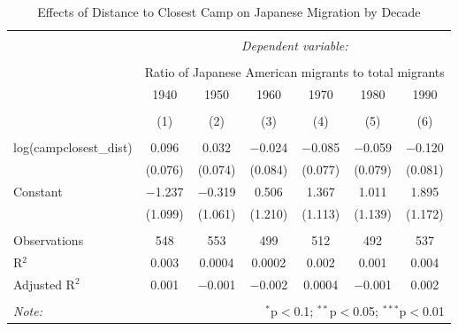 
\begin{table}[!htbp] \centering 
  \caption{Effects of Distance to Closest Camp on Japanese Migration by Decade} 
  \label{} 
\begin{tabular}{@{\extracolsep{5pt}}lcccccc} 
\\[-1.8ex]\hline 
\hline \\[-1.8ex] 
 & \multicolumn{6}{c}{\textit{Dependent variable:}} \\ 
\cline{2-7} 
\\[-1.8ex] & \multicolumn{6}{c}{Ratio of Japanese American migrants to total migrants} \\ 
 & 1940 & 1950 & 1960 & 1970 & 1980 & 1990 \\ 
\\[-1.8ex] & (1) & (2) & (3) & (4) & (5) & (6)\\ 
\hline \\[-1.8ex] 
 log(campclosest\_dist) & 0.096 & 0.032 & $-$0.024 & $-$0.085 & $-$0.059 & $-$0.120 \\ 
  & (0.076) & (0.074) & (0.084) & (0.077) & (0.079) & (0.081) \\ 
  Constant & $-$1.237 & $-$0.319 & 0.506 & 1.367 & 1.011 & 1.895 \\ 
  & (1.099) & (1.061) & (1.210) & (1.113) & (1.139) & (1.172) \\ 
 \hline \\[-1.8ex] 
Observations & 548 & 553 & 499 & 512 & 492 & 537 \\ 
R$^{2}$ & 0.003 & 0.0004 & 0.0002 & 0.002 & 0.001 & 0.004 \\ 
Adjusted R$^{2}$ & 0.001 & $-$0.001 & $-$0.002 & 0.0004 & $-$0.001 & 0.002 \\ 
\hline 
\hline \\[-1.8ex] 
\textit{Note:}  & \multicolumn{6}{r}{$^{*}$p$<$0.1; $^{**}$p$<$0.05; $^{***}$p$<$0.01} \\ 
\end{tabular} 
\end{table} 
